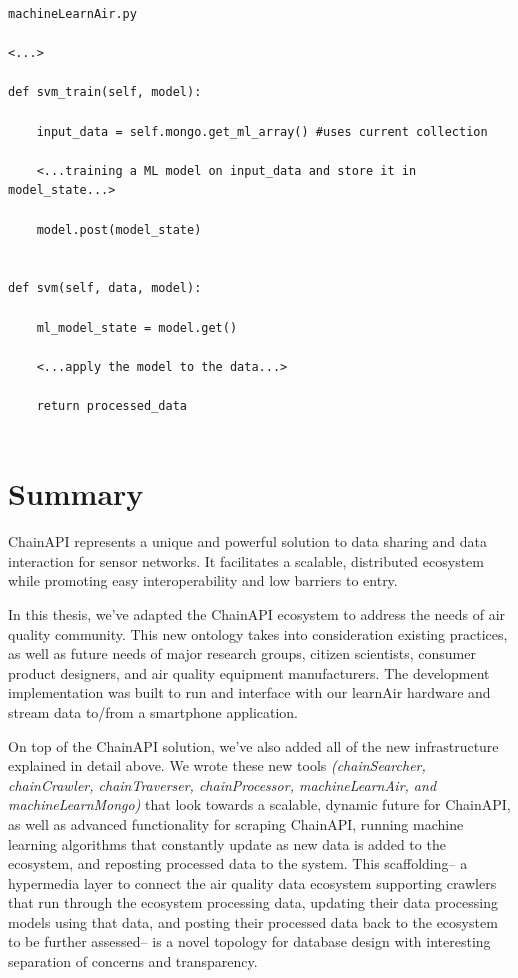 \begin{lstlisting}[style=code]
machineLearnAir.py

<...>

def svm_train(self, model):

	input_data = self.mongo.get_ml_array() #uses current collection

	<...training a ML model on input_data and store it in model_state...>

	model.post(model_state)


def svm(self, data, model):

	ml_model_state = model.get()

	<...apply the model to the data...>

	return processed_data


\end{lstlisting}


\section{Summary}

ChainAPI represents a unique and powerful solution to data sharing and data interaction for sensor networks.  It facilitates a scalable, distributed ecosystem while promoting easy interoperability and low barriers to entry.  

In this thesis, we've adapted the ChainAPI ecosystem to address the needs of air quality community.  This new ontology takes into consideration existing practices, as well as future needs of major research groups, citizen scientists, consumer product designers, and air quality equipment manufacturers.  The development implementation was built to run and interface with our learnAir hardware and stream data to/from a smartphone application.

On top of the ChainAPI solution, we've also added all of the new infrastructure explained in detail above.  We wrote these new tools \textit{(chainSearcher, chainCrawler, chainTraverser, chainProcessor, machineLearnAir, and machineLearnMongo)} that look towards a scalable, dynamic future for ChainAPI, as well as advanced functionality for scraping ChainAPI, running machine learning algorithms that constantly update as new data is added to the ecosystem, and reposting processed data to the system.  This scaffolding-- a hypermedia layer to connect the air quality data ecosystem supporting crawlers that run through the ecosystem processing data, updating their data processing models using that data, and posting their processed data back to the ecosystem to be further assessed-- is a novel topology for database design with interesting separation of concerns and transparency.

